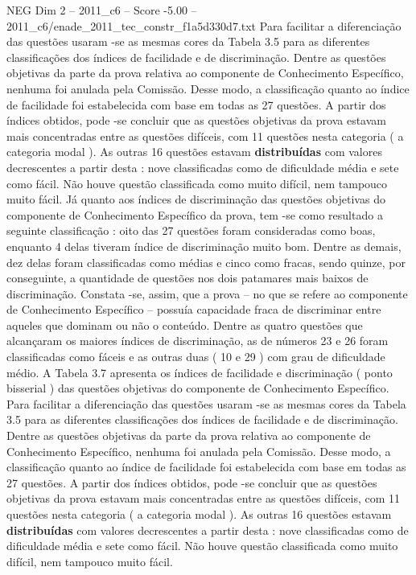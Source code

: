 \begin{textsample}{NEG Dim 2 – 2011\_c6 – Score -5.00 – 2011\_c6/enade\_2011\_tec\_constr\_f1a5d330d7.txt}
Para facilitar a diferenciação das questões usaram -se as mesmas cores da Tabela 3.5 para as diferentes classificações dos índices de facilidade e de discriminação.
Dentre as questões objetivas da parte da prova relativa ao componente de Conhecimento Específico, nenhuma foi anulada pela Comissão.
Desse modo, a classificação quanto ao índice de facilidade foi estabelecida com base em todas as 27 questões.
A partir dos índices obtidos, pode -se concluir que as questões objetivas da prova estavam mais concentradas entre as questões difíceis, com 11 questões nesta categoria ( a categoria modal ).
As outras 16 questões estavam \textbf{distribuídas} com valores decrescentes a partir desta : nove classificadas como de dificuldade média e sete como fácil.
Não houve questão classificada como muito difícil, nem tampouco muito fácil.
Já quanto aos índices de discriminação das questões objetivas do componente de Conhecimento Específico da prova, tem -se como resultado a seguinte classificação : oito das 27 questões foram consideradas como boas, enquanto 4 delas tiveram índice de discriminação muito bom.
Dentre as demais, dez delas foram classificadas como médias e cinco como fracas, sendo quinze, por conseguinte, a quantidade de questões nos dois patamares mais baixos de discriminação.
Constata -se, assim, que a prova – no que se refere ao componente de Conhecimento Específico – possuía capacidade fraca de discriminar entre aqueles que dominam ou não o conteúdo.
Dentre as quatro questões que alcançaram os maiores índices de discriminação, as de números 23 e 26 foram classificadas como fáceis e as outras duas ( 10 e 29 ) com grau de dificuldade médio.
A Tabela 3.7 apresenta os índices de facilidade e discriminação ( ponto bisserial ) das questões objetivas do componente de Conhecimento Específico.
Para facilitar a diferenciação das questões usaram -se as mesmas cores da Tabela 3.5 para as diferentes classificações dos índices de facilidade e de discriminação.
Dentre as questões objetivas da parte da prova relativa ao componente de Conhecimento Específico, nenhuma foi anulada pela Comissão.
Desse modo, a classificação quanto ao índice de facilidade foi estabelecida com base em todas as 27 questões.
A partir dos índices obtidos, pode -se concluir que as questões objetivas da prova estavam mais concentradas entre as questões difíceis, com 11 questões nesta categoria ( a categoria modal ).
As outras 16 questões estavam \textbf{distribuídas} com valores decrescentes a partir desta : nove classificadas como de dificuldade média e sete como fácil.
Não houve questão classificada como muito difícil, nem tampouco muito fácil.

\end{textsample}
